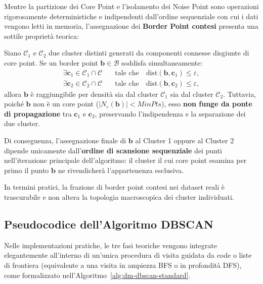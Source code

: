 Mentre la partizione dei Core Point e l'isolamento dei Noise Point sono operazioni rigorosamente deterministiche e indipendenti dall'ordine sequenziale con cui i dati vengono letti in memoria, l'assegnazione dei \textbf{Border Point contesi} presenta una sottile proprietà teorica:

\begin{property}
Siano $\mathcal{C}_1$ e $\mathcal{C}_2$ due cluster distinti generati da componenti connesse disgiunte di core point. Se un border point $\mathbf{b} \in \mathcal{B}$ soddisfa simultaneamente:
\begin{equation}
\begin{aligned}
    \exists \mathbf{c}_1 \in \mathcal{C}_1 \cap \mathcal{C} \quad &\text{tale che} \quad \mathrm{dist}(\mathbf{b}, \mathbf{c}_1) \le \varepsilon, \\
    \exists \mathbf{c}_2 \in \mathcal{C}_2 \cap \mathcal{C} \quad &\text{tale che} \quad \mathrm{dist}(\mathbf{b}, \mathbf{c}_2) \le \varepsilon,
\end{aligned}
\end{equation}
allora $\mathbf{b}$ è raggiungibile per densità sia dal cluster $\mathcal{C}_1$ sia dal cluster $\mathcal{C}_2$.
Tuttavia, poiché $\mathbf{b}$ non è un core point ($|N_\varepsilon(\mathbf{b})| < MinPts$), esso \textbf{non funge da ponte di propagazione} tra $\mathbf{c}_1$ e $\mathbf{c}_2$, preservando l'indipendenza e la separazione dei due cluster.

Di conseguenza, l'assegnazione finale di $\mathbf{b}$ al Cluster 1 oppure al Cluster 2 dipende unicamente dall'\textbf{ordine di scansione sequenziale} dei punti nell'iterazione principale dell'algoritmo: il cluster il cui core point esamina per primo il punto $\mathbf{b}$ ne rivendicherà l'appartenenza esclusiva.
\end{property}

In termini pratici, la frazione di border point contesi nei dataset reali è trascurabile e non altera la topologia macroscopica dei cluster individuati.

\FloatBarrier
\subsection{Pseudocodice dell'Algoritmo DBSCAN}

Nelle implementazioni pratiche, le tre fasi teoriche vengono integrate elegantemente all'interno di un'unica procedura di visita guidata da code o liste di frontiera (equivalente a una visita in ampiezza BFS o in profondità DFS), come formalizzato nell'Algoritmo~\ref{alg:dm-dbscan-standard}.

